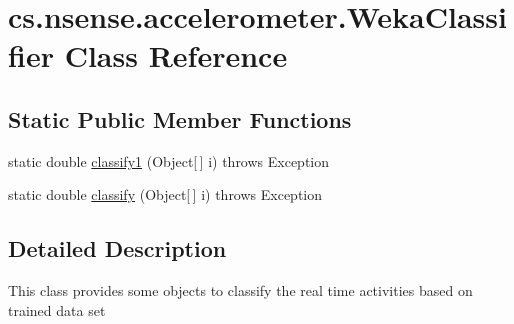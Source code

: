 \hypertarget{classcs_1_1nsense_1_1accelerometer_1_1_weka_classifier}{\section{cs.\-nsense.\-accelerometer.\-Weka\-Classifier Class Reference}
\label{classcs_1_1nsense_1_1accelerometer_1_1_weka_classifier}
}
\subsection*{Static Public Member Functions}
\begin{DoxyCompactItemize}
\item 
static double \hyperlink{classcs_1_1nsense_1_1accelerometer_1_1_weka_classifier_a64067c15e77f1c2ffe406ae22d9ca76d}{classify1} (Object\mbox{[}$\,$\mbox{]} i)  throws Exception 
\item 
static double \hyperlink{classcs_1_1nsense_1_1accelerometer_1_1_weka_classifier_ae82d19dc4bff58968910fe87966440b1}{classify} (Object\mbox{[}$\,$\mbox{]} i)  throws Exception 
\end{DoxyCompactItemize}


\subsection{Detailed Description}
This class provides some objects to classify the real time activities based on trained data set 


